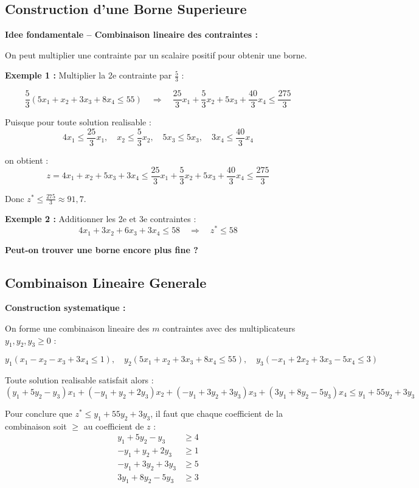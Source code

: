 \documentclass[12pt,a4paper]{article}
\begin{document}
\subsection{Construction d'une Borne Superieure}

\begin{methode}
\textbf{Idee fondamentale -- Combinaison lineaire des contraintes :}

On peut multiplier une contrainte par un scalaire positif pour obtenir une borne.

\textbf{Exemple 1 :} Multiplier la 2e contrainte par $\frac{5}{3}$ :

$$\frac{5}{3}(5x_1 + x_2 + 3x_3 + 8x_4 \leq 55) \quad \Rightarrow \quad \frac{25}{3}x_1 + \frac{5}{3}x_2 + 5x_3 + \frac{40}{3}x_4 \leq \frac{275}{3}$$

Puisque pour toute solution realisable :
$$4x_1 \leq \frac{25}{3}x_1, \quad x_2 \leq \frac{5}{3}x_2, \quad 5x_3 \leq 5x_3, \quad 3x_4 \leq \frac{40}{3}x_4$$

on obtient :
$$z = 4x_1 + x_2 + 5x_3 + 3x_4 \leq \frac{25}{3}x_1 + \frac{5}{3}x_2 + 5x_3 + \frac{40}{3}x_4 \leq \frac{275}{3}$$

Donc $z^* \leq \frac{275}{3} \approx 91{,}7$.

\textbf{Exemple 2 :} Additionner les 2e et 3e contraintes :
$$4x_1 + 3x_2 + 6x_3 + 3x_4 \leq 58 \quad \Rightarrow \quad z^* \leq 58$$

\textbf{Peut-on trouver une borne encore plus fine ?}
\end{methode}

\newpage
\subsection{Combinaison Lineaire Generale}

\begin{methode}
\textbf{Construction systematique :}

On forme une combinaison lineaire des $m$ contraintes avec des multiplicateurs $y_1, y_2, y_3 \geq 0$ :

$$y_1(x_1 - x_2 - x_3 + 3x_4 \leq 1), \quad y_2(5x_1 + x_2 + 3x_3 + 8x_4 \leq 55), \quad y_3(-x_1 + 2x_2 + 3x_3 - 5x_4 \leq 3)$$

Toute solution realisable satisfait alors :
$$(y_1 + 5y_2 - y_3)x_1 + (-y_1 + y_2 + 2y_3)x_2 + (-y_1 + 3y_2 + 3y_3)x_3 + (3y_1 + 8y_2 - 5y_3)x_4 \leq y_1 + 55y_2 + 3y_3$$

Pour conclure que $z^* \leq y_1 + 55y_2 + 3y_3$, il faut que chaque coefficient de la combinaison soit $\geq$ au coefficient de $z$ :
\begin{align*}
y_1 + 5y_2 - y_3 &\geq 4\\
-y_1 + y_2 + 2y_3 &\geq 1\\
-y_1 + 3y_2 + 3y_3 &\geq 5\\
3y_1 + 8y_2 - 5y_3 &\geq 3
\end{align*}
\end{methode}
\end{document}
